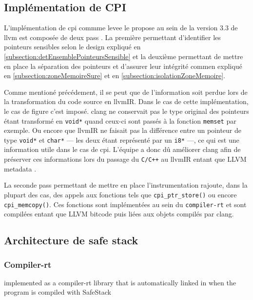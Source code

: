 \subsection{Implémentation de CPI}

L'implémentation de \gls{cpi} commme \gls{levee} le propose au sein de la version 3.3 de \gls{llvm} est composée de deux \og pass \fg. La première permettant d'identifier les pointeurs sensibles selon le design expliqué en \autoref{subsection:detEnsemblePointeursSensible} et la deuxième permettant de mettre en place la séparation des pointeurs et d'assurer leur intégrité commen expliqué en \autoref{subsection:zoneMemoireSure} et en \autoref{subsection:isolationZoneMemoire}.

Comme mentioné précédement, il se peut que de l'information soit perdue lors de la transformation du code source en \gls{llvmIR}. Dans le cas de cette implémentation, le cas de figure c'est imposé. \gls{clang} ne conservait pas le type original des pointeurs étant transformé en \texttt{void*} quand ceux-ci sont passés à la fonction \texttt{memset} par exemple. Ou encore que \gls{llvmIR} ne faisait pas la différence entre un pointeur de type \texttt{void*} et \texttt{char*} --- les deux étant représenté par un \texttt{i8*} ---, ce qui est une information utile dans le cas de \gls{cpi}. L'équipe a donc dû améliorer \gls{clang} afin de préserver ces informations lors du passage du \texttt{C/C++} au \gls{llvmIR} entant que \og LLVM metadata \fg.

La seconde \og pass \fg permettant de mettre en place l'instrumentation rajoute, dans la plupart des cas, des appels aux fonctions tels que \texttt{cpi_ptr_store()} ou encore \texttt{cpi_memcopy()}. Ces fonctions sont implémentées au sein du \og \texttt{compiler-rt} \fg et sont compilées entant que \og LLVM bitcode \fg puis liées aux objets compilés par \gls{clang}.

\subsection{Architecture de \og safe stack \fg}
\label{subsection:architectureSafeStack}

\subsubsection{Compiler-rt}
implemented as a compiler-rt library that is automatically linked in when the program is compiled with SafeStack



